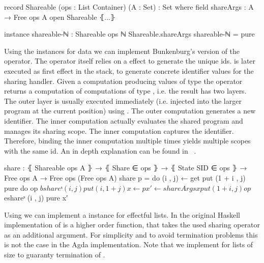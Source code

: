 \begin{code}
record Shareable (ops : List Container) (A : Set) : Set where
  field shareArgs : A → Free ops A
open Shareable ⦃...⦄

instance
  shareable-ℕ : Shareable ops ℕ
  Shareable.shareArgs shareable-ℕ = pure
\end{code}
Using the instances for data we can implement Bunkenburg's version of the
operator.
The operator itself relies on a  effect to generate the
unique ids.
 is later executed as first effect in the stack, to generate
concrete identifier values for the sharing handler.
Given a computation producing values of type  the operator
returns a computation of computations of type , i.e. the result
has two \AgdaSpace{} layers.
The outer layer is usually executed immediately (i.e. injected into the larger
program at the current position) using \AgdaFunction{>>=}.
The outer computation generates a new identifier.
The inner computation actually evaluates the shared program and manages its
sharing scope.
The inner computation captures the identifier.
Therefore, binding the inner computation multiple times yields multiple scopes
with the same id.
An in depth explanation can be found in
~\cite{bunkenburg2019modeling}.

\begin{code}
share : ⦃ Shareable ops A ⦄ → ⦃ Share ∈ ops ⦄ → ⦃ State SID ∈ ops ⦄ →
  Free ops A → Free ops (Free ops A)
share p = do (i , j) ← get
             put (1 + i , j)
             pure do op $ bshareˢ (i , j)
                     put (i , 1 + j)
                     x   ← p
                     x′  ← shareArgs x
                     put (1 + i , j)
                     op $ eshareˢ (i , j)
                     pure x′
\end{code}
Using  we can implement a  instance
for effectful lists.
In the original Haskell implementation of  is a higher
order function, that takes the used sharing operator as an additional
argument.
For simplicity and to avoid termination problems this is not the case in the
Agda implementation.
Note that we implement  for lists of size
 to guaranty termination of .



